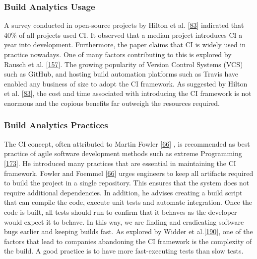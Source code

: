 \documentclass[]{book}
\begin{document}
\subsubsection{Build Analytics Usage}\label{build-analytics-usage}

A survey conducted in open-source projects by Hilton et al.
{[}\protect\hyperlink{ref-hilton2016usage}{83}{]} indicated that 40\% of
all projects used CI. It observed that a median project introduces CI a
year into development. Furthermore, the paper claims that CI is widely
used in practice nowadays. One of many factors contributing to this is
explored by Rausch et al.
{[}\protect\hyperlink{ref-rausch2017empirical}{157}{]}. The growing
popularity of Version Control Systems (VCS) such as GitHub, and hosting
build automation platforms such as Travis have enabled any business of
size to adopt the CI framework. As suggested by Hilton et al.
{[}\protect\hyperlink{ref-hilton2016usage}{83}{]}, the cost and time
associated with introducing the CI framework is not enormous and the
copious benefits far outweigh the resources required.

\subsubsection{Build Analytics
Practices}\label{build-analytics-practices}

The CI concept, often attributed to Martin Fowler
{[}\protect\hyperlink{ref-fowler2006continuous}{66}{]} , is recommended
as best practice of agile software development methods such as extreme
Programming {[}\protect\hyperlink{ref-stolberg2009enabling}{173}{]}. He
introduced many practices that are essential in maintaining the CI
framework. Fowler and Foemmel
{[}\protect\hyperlink{ref-fowler2006continuous}{66}{]} urges engineers
to keep all artifacts required to build the project in a single
repository. This ensures that the system does not require additional
dependencies. In addition, he advises creating a build script that can
compile the code, execute unit tests and automate integration. Once the
code is built, all tests should run to confirm that it behaves as the
developer would expect it to behave. In this way, we are finding and
eradicating software bugs earlier and keeping builds fast. As explored
by Widder et al.{[}\protect\hyperlink{ref-widder2018m}{190}{]}, one of
the factors that lead to companies abandoning the CI framework is the
complexity of the build. A good practice is to have more fast-executing
tests than slow tests.
\end{document}
